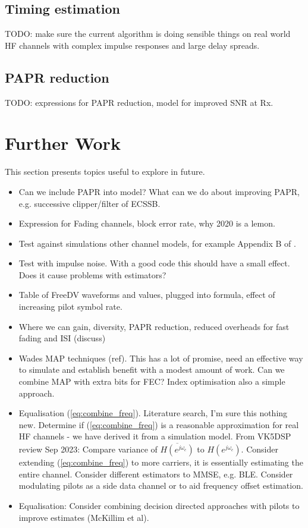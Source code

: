 \documentclass{article}
\begin{document}
\subsection{Timing estimation}

TODO: make sure the current algorithm is doing sensible things on real world HF channels with complex impulse responses and large delay spreads.

\subsection{PAPR reduction}

TODO: expressions for PAPR reduction, model for improved SNR at Rx.

\section{Further Work}

This section presents topics useful to explore in future.

\begin{itemize}
\item Can we include PAPR into model?  What can we do about improving PAPR, e.g. successive clipper/filter of ECSSB.
\item Expression for Fading channels, block error rate, why 2020 is a lemon.
\item Test against simulations other channel models, for example Appendix B of \cite{etsi201}.
\item Test with impulse noise.  With a good code this should have a small effect.  Does it cause problems with estimators?
\item Table of FreeDV waveforms and values, plugged into formula, effect of increasing pilot symbol rate.
\item Where we can gain, diversity, PAPR reduction, reduced overheads for fast fading and ISI (discuss)
\item Wades MAP techniques (ref).  This has a lot of promise, need an effective way to simulate and establish benefit with a modest amount of work.  Can we combine MAP with extra bits for FEC?  Index optimisation also a simple approach.
\item Equalisation (\ref{eq:combine_freq}). Literature search, I'm sure this nothing new. Determine if (\ref{eq:combine_freq}) is a reasonable approximation for real HF channels - we have derived it from a simulation model.  From VK5DSP review Sep 2023: Compare variance of $\overline{H(e^{j \omega_c})}$ to $H(e^{j \omega_c})$. Consider extending (\ref{eq:combine_freq}) to more carriers, it is essentially estimating the entire channel.  Consider different estimators to MMSE, e.g. BLE. Consider modulating pilots as a side data channel or to aid frequency offset estimation. 
\item Equalisation: Consider combining decision directed approaches with pilots to improve estimates (McKillim et al).
\end{itemize} 

\nocite{*}


\end{document}
